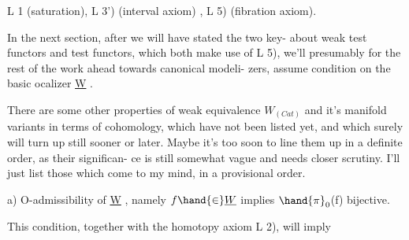 L 1 (saturation),  L 3') (interval axiom) , L 5) (fibration axiom).

In the next section,  after we will have stated the two key-
about weak test functors and test functors,  which both make use of L 5),
we'll presumably\hand{,} for the rest of the work ahead towards canonical modeli-%
zers,  assume   condition on the basic ocalizer \underline{W} .

There  are some other properties of weak equivalence $W_{(Cat)}$ and it's
manifold variants in terms of cohomology,  which have not been listed
yet,  and which surely will turn up still sooner or later.  Maybe it's
too soon to line them up in a definite order,  as their  significan-%
ce is still somewhat vague  and needs closer scrutiny.  I'll just list
those which come to my mind,  in a provisional order. 

 a)  O-admissibility of \underline{W} , namely $f \hand{\in} \underline{W}$  implies $\hand{\pi}_0$(f) bijective.

This condition,  together with the homotopy axiom L 2),  will imply

